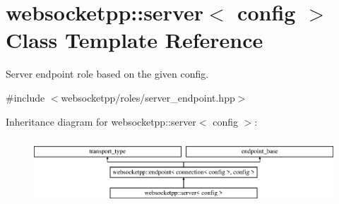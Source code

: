 \hypertarget{classwebsocketpp_1_1server}{}\section{websocketpp\+:\+:server$<$ config $>$ Class Template Reference}
\label{classwebsocketpp_1_1server}


Server endpoint role based on the given config.  




{\ttfamily \#include $<$websocketpp/roles/server\+\_\+endpoint.\+hpp$>$}

Inheritance diagram for websocketpp\+:\+:server$<$ config $>$\+:\begin{figure}[H]
\begin{center}
\leavevmode
\includegraphics[height=2.500000cm]{classwebsocketpp_1_1server}
\end{center}
\end{figure}

